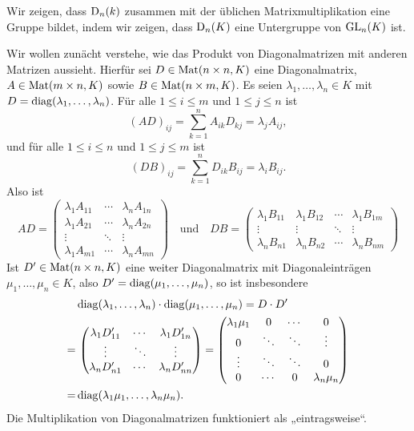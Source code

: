 Wir zeigen, dass $\mathrm{D}_n(k)$ zusammen mit der üblichen Matrixmultiplikation eine Gruppe bildet, indem wir zeigen, dass $\mathrm{D}_n(K)$ eine Untergruppe von $\mathrm{GL}_n(K)$ ist.

Wir wollen zunächt verstehe, wie das Produkt von Diagonalmatrizen mit anderen Matrizen aussieht. Hierfür sei $D \in \mathrm{Mat}(n \times n, K)$ eine Diagonalmatrix, $A \in \mathrm{Mat}(m \times n, K)$ sowie $B \in \mathrm{Mat}(n \times m, K)$. Es seien $\lambda_1, \dotsc, \lambda_n \in K$ mit $D = \mathrm{diag}(\lambda_1, \dotsc, \lambda_n)$. Für alle $1 \leq i \leq m$ und $1 \leq j \leq n$ ist
\[
 (AD)_{ij}
 = \sum_{k=1}^n A_{ik} D_{kj}
 = \lambda_j A_{ij},
\]
und für alle $1 \leq i \leq n$ und $1 \leq j \leq m$ ist
\[
 (DB)_{ij}
 = \sum_{k=1}^n D_{ik} B_{ij}
 = \lambda_i B_{ij}.
\]
Also ist
\[
 AD =
 \begin{pmatrix}
  \lambda_1 A_{11} & \cdots & \lambda_n A_{1n} \\
  \lambda_1 A_{21} & \cdots & \lambda_n A_{2n} \\
  \vdots           & \ddots & \vdots           \\
  \lambda_1 A_{m1} & \cdots & \lambda_n A_{mn} 
 \end{pmatrix}
 \quad\text{und}\quad
 DB =
 \begin{pmatrix}
  \lambda_1 B_{11} & \lambda_1 B_{12} & \cdots & \lambda_1 B_{1m} \\
  \vdots           & \vdots           & \ddots & \vdots \\
  \lambda_n B_{n1} & \lambda_n B_{n2} & \cdots & \lambda_n B_{nm}
 \end{pmatrix}
\]
Ist $D' \in \mathrm{Mat}(n \times n, K)$ eine weiter Diagonalmatrix mit Diagonaleinträgen $\mu_1, \dotsc, \mu_n \in K$, also $D' = \mathrm{diag}(\mu_1, \dotsc, \mu_n)$, so ist insbesondere
\begin{align*}
  &\, \mathrm{diag}(\lambda_1, \dotsc, \lambda_n) \cdot \mathrm{diag}(\mu_1, \dotsc, \mu_n)
 = D \cdot D' \\
 =&\,
 \begin{pmatrix}
  \lambda_1 D'_{11} & \cdots & \lambda_1 D'_{1n} \\
  \vdots            & \ddots & \vdots           \\
  \lambda_n D'_{n1} & \cdots & \lambda_n D'_{nn}
 \end{pmatrix}
 =
 \begin{pmatrix}
  \lambda_1 \mu_1 & 0      & \cdots & 0      \\
  0               & \ddots & \ddots & \vdots \\
  \vdots          & \ddots & \ddots & 0      \\
  0               & \cdots & 0      & \lambda_n \mu_n
 \end{pmatrix} \\
 =&\, \mathrm{diag}(\lambda_1 \mu_1, \dotsc, \lambda_n \mu_n).
\end{align*}
Die Multiplikation von Diagonalmatrizen funktioniert als „eintragsweise“.

